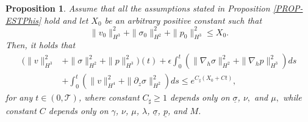 \documentclass[12pt,reqno]{amsart}
\numberwithin{equation}{section}
\newtheorem{proposition}[theorem]{Proposition}
\begin{document}
\begin{proposition}
\label{PROP-EST-UnderM}
Assume that all the assumptions stated in Proposition \ref{PROP-ESTPhis} hold and let $X_0$ be an arbitrary positive constant such that
$$
\|v_0\|_{H^3}^2+\|\sigma_0\|_{H^2}^2+\|p_0\|_{H^3}^2\leq X_0.
$$
Then, it holds that
\begin{align*}
(\|v\|_{H^3}^2&+\|\sigma\|_{H^2}^2+\|p\|_{H^3}^2)(t)+\epsilon\int_0^t(\|\nabla_h\sigma\|_{H^2}^2+\|\nabla_hp\|_{H^3}^2)ds\nonumber\\
  &+\int_0^t(\|v\|_{H^4}^2+\|\partial_z\sigma\|_{H^2}^2)ds \leq e^{C_\sharp(X_0+Ct) },
\end{align*}
for any $t\in(0,\mathcal T)$,
where constant $C_\sharp\geq1$ depends only on $\underline\sigma$, $\nu,$ and $\mu,$ while constant $C$ depends only on $\gamma$, $\nu$, $\mu$,
$\lambda$, $\underline\sigma$, $\underline p$, and $M$.
\end{proposition}
\end{document}

